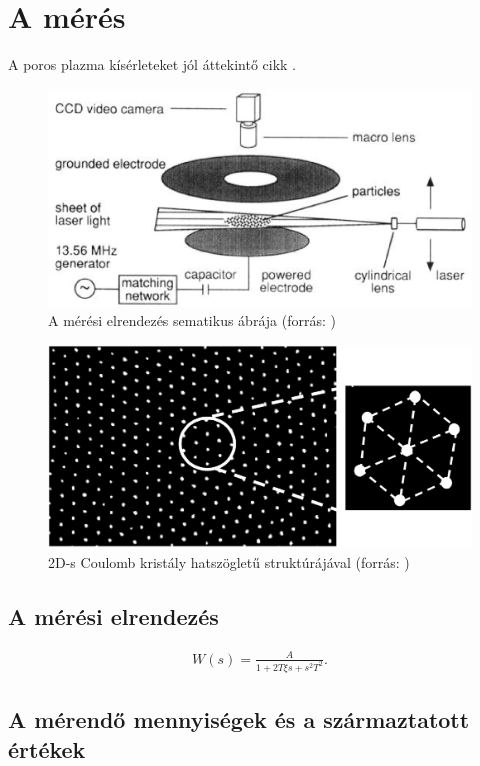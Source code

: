 \chapter{A mérés}

	A poros plazma kísérleteket jól áttekintő cikk \cite{merlino2006dusty}.

	\begin{figure}[!h]
		\centering
		\includegraphics[width=0.9\columnwidth]{figures/eps/dust_camera.eps}
		\caption{A mérési elrendezés sematikus ábrája (forrás: \cite{merlino2006dusty})} 
		\label{fig:device} 
	\end{figure}
	
	\begin{figure}[!h]
		\centering
		\includegraphics[width=0.9\columnwidth]{figures/eps/coulomb_crystal.eps}
		\caption{2D-s Coulomb kristály hatszögletű struktúrájával (forrás: \cite{merlino2006dusty})} 
		\label{fig:device} 
	\end{figure}


\section{A mérési elrendezés}
	
	\begin{align}
	W(s)=\frac{A}{1+2T\xi s+s^2T^2}.
	\end{align}

\section{A mérendő mennyiségek és a származtatott értékek}










